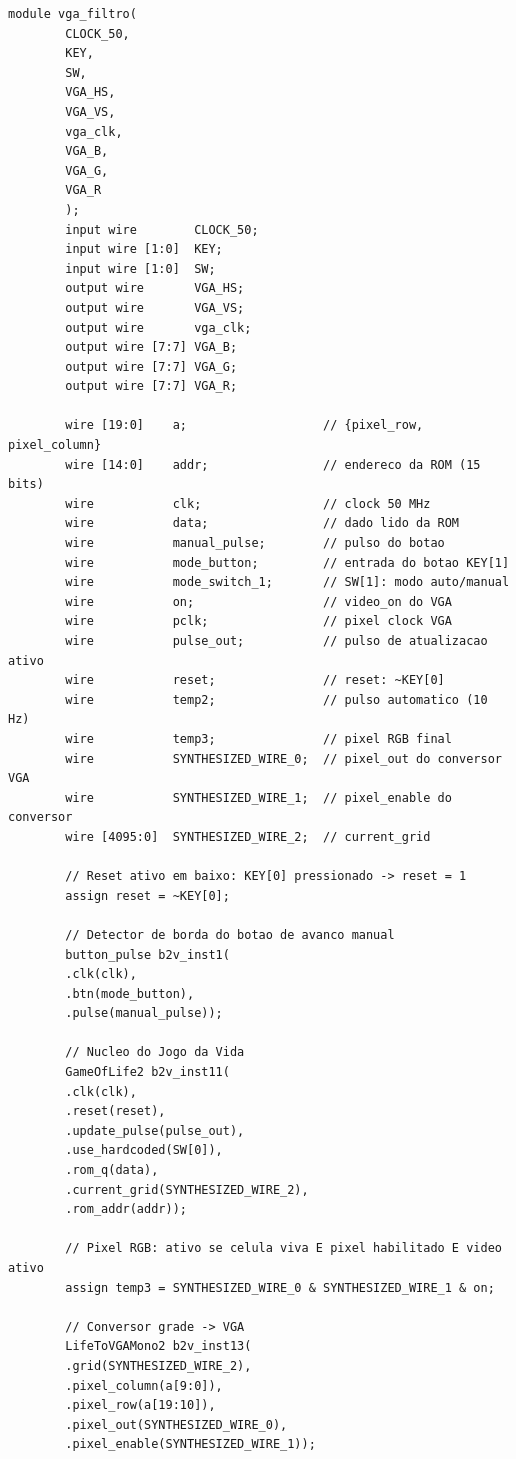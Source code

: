 \documentclass[12pt, a4paper]{article}
\begin{document}
	\begin{lstlisting}[style=verilog, caption={\texttt{vga\_filtro.v} --- Módulo \textit{top-level} gerado pelo editor BDF do Quartus Prime, integrando todos os componentes do sistema.}, label={lst:top}]
		module vga_filtro(
		CLOCK_50,
		KEY,
		SW,
		VGA_HS,
		VGA_VS,
		vga_clk,
		VGA_B,
		VGA_G,
		VGA_R
		);
		input wire        CLOCK_50;
		input wire [1:0]  KEY;
		input wire [1:0]  SW;
		output wire       VGA_HS;
		output wire       VGA_VS;
		output wire       vga_clk;
		output wire [7:7] VGA_B;
		output wire [7:7] VGA_G;
		output wire [7:7] VGA_R;
		
		wire [19:0]    a;                   // {pixel_row, pixel_column}
		wire [14:0]    addr;                // endereco da ROM (15 bits)
		wire           clk;                 // clock 50 MHz
		wire           data;                // dado lido da ROM
		wire           manual_pulse;        // pulso do botao
		wire           mode_button;         // entrada do botao KEY[1]
		wire           mode_switch_1;       // SW[1]: modo auto/manual
		wire           on;                  // video_on do VGA
		wire           pclk;                // pixel clock VGA
		wire           pulse_out;           // pulso de atualizacao ativo
		wire           reset;               // reset: ~KEY[0]
		wire           temp2;               // pulso automatico (10 Hz)
		wire           temp3;               // pixel RGB final
		wire           SYNTHESIZED_WIRE_0;  // pixel_out do conversor VGA
		wire           SYNTHESIZED_WIRE_1;  // pixel_enable do conversor
		wire [4095:0]  SYNTHESIZED_WIRE_2;  // current_grid
		
		// Reset ativo em baixo: KEY[0] pressionado -> reset = 1
		assign reset = ~KEY[0];
		
		// Detector de borda do botao de avanco manual
		button_pulse b2v_inst1(
		.clk(clk),
		.btn(mode_button),
		.pulse(manual_pulse));
		
		// Nucleo do Jogo da Vida
		GameOfLife2 b2v_inst11(
		.clk(clk),
		.reset(reset),
		.update_pulse(pulse_out),
		.use_hardcoded(SW[0]),
		.rom_q(data),
		.current_grid(SYNTHESIZED_WIRE_2),
		.rom_addr(addr));
		
		// Pixel RGB: ativo se celula viva E pixel habilitado E video ativo
		assign temp3 = SYNTHESIZED_WIRE_0 & SYNTHESIZED_WIRE_1 & on;
		
		// Conversor grade -> VGA
		LifeToVGAMono2 b2v_inst13(
		.grid(SYNTHESIZED_WIRE_2),
		.pixel_column(a[9:0]),
		.pixel_row(a[19:10]),
		.pixel_out(SYNTHESIZED_WIRE_0),
		.pixel_enable(SYNTHESIZED_WIRE_1));
		

\end{lstlisting}
\end{document}
